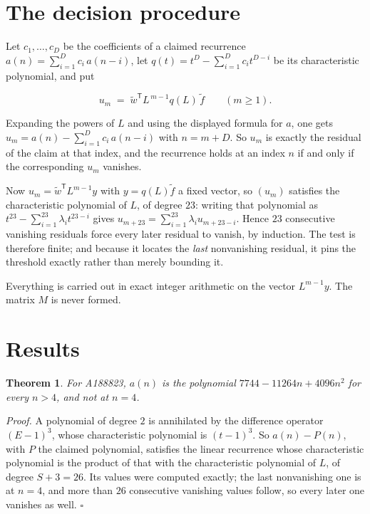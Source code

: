 \documentclass[11pt]{article}
\newtheorem{theorem}{Theorem}
\theoremstyle{definition}
\begin{document}
\section{The decision procedure}

Let $c_1,\dots,c_D$ be the coefficients of a claimed recurrence $a(n) = \sum_{i=1}^{D} c_i\,a(n-i)$, let $q(t) = t^{D} - \sum_{i=1}^{D} c_i t^{D-i}$ be its characteristic polynomial, and put

\[u_m \;=\; \tilde w^{\mathsf T} L^{\,m-1} q(L)\,\tilde f \qquad (m \ge 1).\]

Expanding the powers of $L$ and using the displayed formula for $a$, one gets $u_m = a(n) - \sum_{i=1}^{D} c_i\,a(n-i)$ with $n = m + D$. So $u_m$ is exactly the residual of the claim at that index, and the recurrence holds at an index $n$ if and only if the corresponding $u_m$ vanishes.

Now $u_m = \tilde w^{\mathsf T} L^{m-1} y$ with $y = q(L)\tilde f$ a fixed vector, so $(u_m)$ satisfies the characteristic polynomial of $L$, of degree $23$: writing that polynomial as $t^{23} - \sum_{i=1}^{23} \lambda_i t^{23-i}$ gives $u_{m+23} = \sum_{i=1}^{23} \lambda_i u_{m+23-i}$. Hence $23$ consecutive vanishing residuals force every later residual to vanish, by induction. The test is therefore finite; and because it locates the {\itshape last} nonvanishing residual, it pins the threshold exactly rather than merely bounding it.

Everything is carried out in exact integer arithmetic on the vector $L^{m-1}y$. The matrix $M$ is never formed.

\section{Results}

\begin{theorem} For A188823, $a(n)$ is the polynomial $7744 - 11264n + 4096n^{2}$ for every $n > 4$, and not at $n = 4$.\end{theorem}

{\itshape Proof.} A polynomial of degree $2$ is annihilated by the difference operator $(E-1)^{3}$, whose characteristic polynomial is $(t-1)^{3}$. So $a(n) - P(n)$, with $P$ the claimed polynomial, satisfies the linear recurrence whose characteristic polynomial is the product of that with the characteristic polynomial of $L$, of degree $S + 3 = 26$. Its values were computed exactly; the last nonvanishing one is at $n = 4$, and more than $26$ consecutive vanishing values follow, so every later one vanishes as well. $\square$
\end{document}
